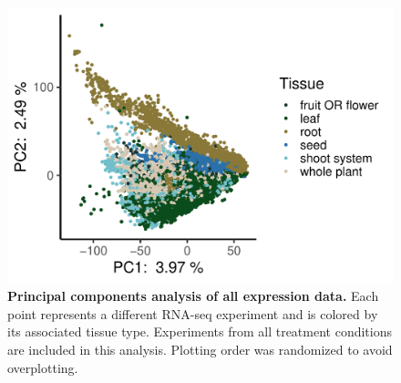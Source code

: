 \documentclass[12pt]{article}
\begin{document}
\begin{figure}[H]
\centering
\includegraphics[width=\textwidth]{figures/chapter_1/pcaBySample_Tissue.pdf}
\caption{\textbf{Principal components analysis of all expression data.} Each point represents a different RNA-seq experiment and is colored by its associated tissue type. Experiments from all treatment conditions are included in this analysis. Plotting order was randomized to avoid overplotting.}%
\label{fig:pcaTissue}
\end{figure}
\end{document}
